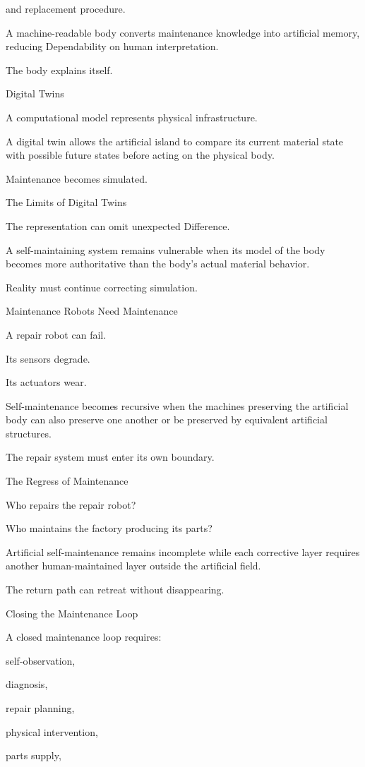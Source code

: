 and replacement procedure.

A machine-readable body converts maintenance knowledge into artificial memory, reducing Dependability on human interpretation.

The body explains itself.

Digital Twins

A computational model represents physical infrastructure.

A digital twin allows the artificial island to compare its current material state with possible future states before acting on the physical body.

Maintenance becomes simulated.

The Limits of Digital Twins

The representation can omit unexpected Difference.

A self-maintaining system remains vulnerable when its model of the body becomes more authoritative than the body’s actual material behavior.

Reality must continue correcting simulation.

Maintenance Robots Need Maintenance

A repair robot can fail.

Its sensors degrade.

Its actuators wear.

Self-maintenance becomes recursive when the machines preserving the artificial body can also preserve one another or be preserved by equivalent artificial structures.

The repair system must enter its own boundary.

The Regress of Maintenance

Who repairs the repair robot?

Who maintains the factory producing its parts?

Artificial self-maintenance remains incomplete while each corrective layer requires another human-maintained layer outside the artificial field.

The return path can retreat without disappearing.

Closing the Maintenance Loop

A closed maintenance loop requires:

self-observation,

diagnosis,

repair planning,

physical intervention,

parts supply,

